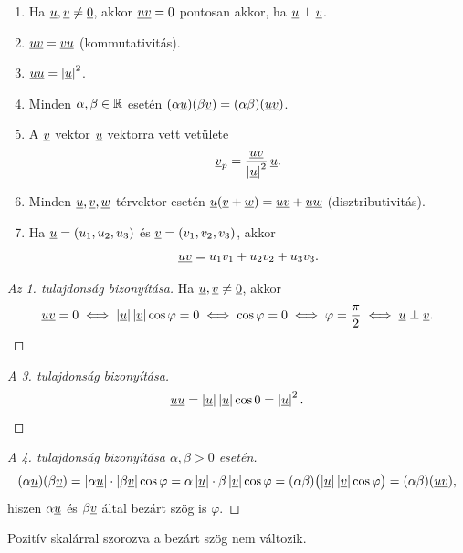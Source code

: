 \documentclass[11pt]{article}
\begin{document}
\begin{thmbox}
\begin{theorem}
\begin{enumerate}[label=\arabic*.]
\item Ha $\underline{u}, \underline{v}\neq\underline{0}$, akkor $\underline{u}\underline{v}=0$ pontosan akkor, ha $\underline{u}\perp\underline{v}$.
\item $\underline{u}\underline{v}=\underline{v}\underline{u}$ (kommutativitás).
\item $\underline{u}\underline{u}=\left|\underline{u}\right|^{2}$.
\item Minden $\alpha, \beta\in\mathbb{R}$ esetén $(\alpha\underline{u})(\beta\underline{v})=(\alpha\beta)(\underline{u}\underline{v})$.
\item A $\underline{v}$ vektor $\underline{u}$ vektorra vett vetülete
\[
\underline{v}_{p}=\frac{\underline{u}\underline{v}}{\left|\underline{u}\right|^{2}}\,\underline{u} .
\]
\item Minden $\underline{u}, \underline{v}, \underline{w}$ térvektor esetén $\underline{u}(\underline{v}+\underline{w})=\underline{u}\underline{v}+\underline{u}\underline{w}$ (disztributivitás).
\item Ha $\underline{u}=(u_{1}, u_{2}, u_{3})$ és $\underline{v}=(v_{1}, v_{2}, v_{3})$, akkor
\[
\underline{u}\underline{v}=u_{1}v_{1}+u_{2}v_{2}+u_{3}v_{3}.
\]
\end{enumerate}
\end{theorem}
\end{thmbox}

\begin{proof}[Az 1. tulajdonság bizonyítása]
Ha $\underline{u}, \underline{v}\neq\underline{0}$, akkor
\[
\underline{u}\underline{v}=0
\iff \left|\underline{u}\right|\left|\underline{v}\right|\cos\varphi=0
\iff \cos\varphi=0
\iff \varphi=\frac{\pi}{2}
\iff \underline{u}\perp\underline{v} .
\]
\end{proof}

\begin{proof}[A 3. tulajdonság bizonyítása]
\[
\underline{u}\underline{u}=\left|\underline{u}\right|\left|\underline{u}\right|\cos 0=\left|\underline{u}\right|^{2}.
\]
\end{proof}

\begin{proof}[A 4. tulajdonság bizonyítása $\alpha, \beta>0$ esetén]
\[
(\alpha\underline{u})(\beta\underline{v})=\left|\alpha\underline{u}\right|\cdot\left|\beta\underline{v}\right|\cos\varphi
=\alpha\left|\underline{u}\right|\cdot\beta\left|\underline{v}\right|\cos\varphi
=(\alpha\beta)\bigl(\left|\underline{u}\right|\left|\underline{v}\right|\cos\varphi\bigr)=(\alpha\beta)(\underline{u}\underline{v}),
\]
hiszen $\alpha\underline{u}$ és $\beta\underline{v}$ által bezárt szög is $\varphi$.
\end{proof}

\begin{notefig}{Pozitív skalárral szorozva a bezárt szög nem változik.}
\end{notefig}
\end{document}
